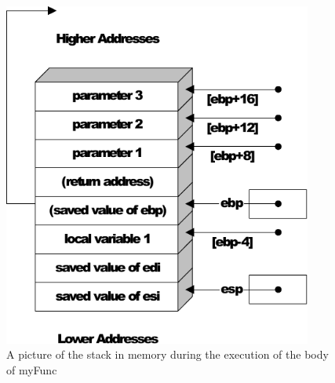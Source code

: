 \begin{figure}[h]
\centering
\includegraphics[width=4in]{x86/x86-activation-record.pdf}
\caption{A picture of the stack in memory during the execution of the body of myFunc}
\label{x86-activation-record.fig}
\end{figure}
